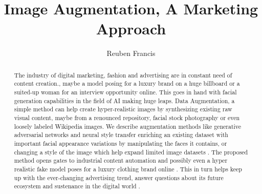 \documentclass[preprint,12pt]{elsarticle}
\begin{document}
\begin{frontmatter}

\title{Image Augmentation, A Marketing Approach}

\author{Reuben Francis}

\address{Macquarie University}

\begin{abstract}
The industry of digital marketing, fashion and advertising are in constant need of content creation., maybe a model posing for a luxury brand on a huge billboard or a suited-up woman for an interview opportunity online. This goes in hand with facial generation capabilities in the field of AI making huge leaps. Data Augmentation, a simple method can help create hyper-realistic images by synthesizing existing raw visual content, maybe from a renounced repository, facial stock photography or even loosely labeled Wikipedia images. We describe augmentation methods like generative adversarial networks and neural style transfer enriching an existing dataset with important facial appearance variations by manipulating the faces it contains, or changing a style of the image which help expand limited image datasets \cite{masi2016really}. The proposed method opens gates to industrial content automation and possibly even a hyper realistic fake model poses for a luxury clothing brand online \cite{DataGrid2019AI}. This in turn helps keep up with the ever-changing advertising trend, answer questions about its future ecosystem and sustenance in the digital world . 
\end{abstract}

\end{frontmatter}
\end{document}
